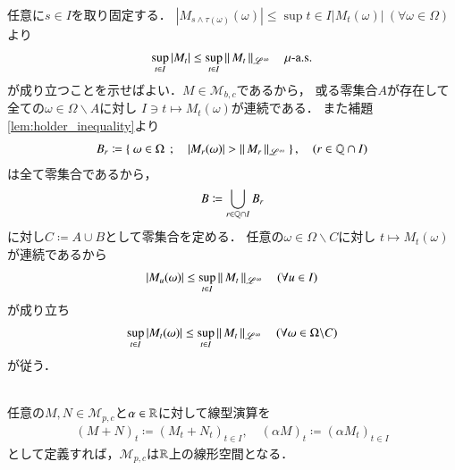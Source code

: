 	\begin{prf}
		任意に$s \in I$を取り固定する．
		$|M_{s \wedge \tau(\omega)}(\omega)| \leq \sup{t \in I}{|M_t(\omega)|}\ (\forall \omega \in \Omega)$より
		\begin{align}
			\operatorname*{sup}_{t \in I} |M_t| \leq \operatorname*{sup}_{t \in I} \left\|\, M_t\, \right\|_{\mathscr{L}^\infty}
			\quad \mbox{$\mu$-a.s.}
		\end{align}
		が成り立つことを示せばよい．$M \in \mathcal{M}_{b,c}$であるから，
		或る零集合$A$が存在して全ての$\omega \in \Omega \backslash A$に対し
		$I \ni t \longmapsto M_t(\omega)$が連続である．
		また補題\ref{lem:holder_inequality}より
		\begin{align}
			B_r \coloneqq \left\{\ \omega \in \Omega\ \, ; \quad |M_r(\omega)| > \left\|\, M_r\, \right\|_{\mathscr{L}^\infty}\ \right\},
			\quad (r \in \mathbb{Q} \cap I)
		\end{align}
		は全て零集合であるから，
		\begin{align}
			B \coloneqq \bigcup_{r \in \mathbb{Q} \cap I} B_r
		\end{align}
		に対し$C \coloneqq A \cup B$として零集合を定める．
		任意の$\omega \in \Omega \backslash C$に対し
		$t \longmapsto M_t(\omega)$が連続であるから
		\begin{align}
			|M_u(\omega)| \leq \operatorname*{sup}_{t \in I} \left\|\, M_t\, \right\|_{\mathscr{L}^\infty}
			\quad (\forall u \in I)
		\end{align}
		が成り立ち
		\begin{align}
			\operatorname*{sup}_{t \in I} |M_t(\omega)| \leq \operatorname*{sup}_{t \in I} \left\|\, M_t\, \right\|_{\mathscr{L}^\infty}
			\quad (\forall \omega \in \Omega \backslash C)
		\end{align}
		が従う．
		\QED
	\end{prf}
	
	\begin{screen}
		\begin{lem}\mbox{}\\
			任意の$M,N \in \mathcal{M}_{p,c}$と$\alpha \in \mathbb{R}$に対して線型演算を
			\begin{align}
				(M + N)_t \coloneqq (M_t + N_t)_{t \in I}, 
				\quad (\alpha M)_t \coloneqq (\alpha M_t)_{t \in I}
				\label{eq:mart_linear_arithmetic_0}
			\end{align}
			として定義すれば，$\mathcal{M}_{p,c}$は$\mathbb{R}$上の線形空間となる．
		\end{lem}
	\end{screen}
	
	
